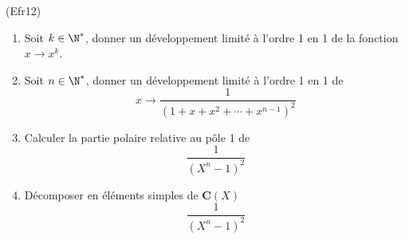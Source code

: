 \begin{tiny}(Efr12)\end{tiny} 
\begin{enumerate}
\item  Soit $k\in \N^{*}$, donner un d\'{e}veloppement limit\'{e} \`{a} l'ordre 1 en 1 de la fonction $x\rightarrow x^{k}$.

\item  Soit $n\in \N^{*}$, donner un d\'{e}veloppement limit\'{e} \`{a} l'ordre 1 en 1 de 
\[
x\rightarrow \frac{1}{(1+x+x^{2}+\cdots +x^{n-1})^{2}}
\]

\item  Calculer la partie polaire relative au p\^{o}le 1 de 
\[
\frac{1}{(X^{n}-1)^{2}}
\]

\item  D\'{e}composer en \'{e}l\'{e}ments simples de $\mathbf{C}(X)$ 
\[
\frac{1}{(X^{n}-1)^{2}}
\]
\end{enumerate}
